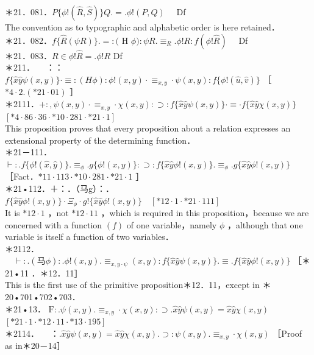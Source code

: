 \documentclass[10pt]{article}
\begin{document}
＊21．081．$P\{\phi!(\widehat{R}, \widehat{S})\} Q .=. \phi!(P, Q) \quad$ Df\\
The convention as to typographic and alphabetic order is here retained．\\
＊21．082．$f\{\hat{R}(\psi R)\} .=:($ H $\phi): \psi R . \equiv_{R} . \phi!R: f(\phi!\hat{R}) \quad$ Df\\
＊21．083．$R \in \phi!\hat{R}=. \phi!R$ Df\\
＊211．$\quad$ ：：$f\{\hat{x} \hat{y} \psi(x, y)\} \cdot \equiv:(H \phi): \phi!(x, y) \cdot \equiv_{x, y} \cdot \psi(x, y): f\{\phi!(\hat{u}, \hat{v})\}$ ［ $* 4 \cdot 2 .(* 21 \cdot 01)$ ］\\
＊2111．$+:, \psi(x, y) \cdot \equiv_{x, y} \cdot \chi(x, y): \supset: f\{\hat{x} \hat{y} \psi(x, y)\} \cdot \equiv \cdot f\{\hat{x} \hat{y} \chi(x, y)\}$\\
$[* 4 \cdot 86 \cdot 36 \cdot * 10 \cdot 281 \cdot * 21 \cdot 1]$\\
This proposition proves that every proposition about a relation expresses an extensional property of the determining function．\\
＊21－111．$\vdash: . f\{\phi!(\hat{x}, \hat{y})\} . \equiv_{\phi} . g\{\phi!(x, y)\}: \supset: f\{\hat{x} \hat{y} \phi!(x, y)\} . \equiv_{\phi} . g\{\hat{x} \hat{y} \phi!(x, y)\}$ ［Fact．$* 11 \cdot 113 \cdot * 10 \cdot 281 \cdot * 21 \cdot 1$ ］\\
＊21•112．＋：．（马g）：．$f\{\hat{x} \hat{y} \phi!(x, y)\} \cdot \Xi_{\phi} \cdot g!\{\hat{x} \hat{y} \phi!(x, y)\} \quad[* 12 \cdot 1 \cdot * 21 \cdot 111]$\\
It is $* 12 \cdot 1$ ，not $* 12 \cdot 11$ ，which is required in this proposition，because we are concerned with a function $(f)$ of one variable，namely $\phi$ ，although that one variable is itself a function of two variables．\\
＊2112．$\quad \vdash: .(马 \phi): . \phi!(x, y) . \equiv_{x, y \cdot \psi}(x, y): f\{\hat{x} \hat{y} \psi(x, y)\} . \equiv . f\{\hat{x} \hat{y} \phi!(x, y)\}$ ［＊21•11 ．＊12．11］\\
This is the first use of the primitive proposition＊12．11，except in ＊20•701•702•703．\\
＊21•13． $\mathrm{F}: . \psi(x, y) . \equiv_{x, y} \cdot \chi(x, y): \supset . \hat{x} \hat{y} \psi(x, y)=\hat{x} \hat{y} \chi(x, y)$\\
$[* 21 \cdot 1 \cdot * 12 \cdot 11 \cdot * 13 \cdot 195]$\\
＊2114．$\quad$ ：$. \hat{x} \hat{y} \psi(x, y)=\hat{x} \hat{y} \chi(x, y) . \supset: \psi(x, y) . \equiv_{x, y} \cdot \chi(x, y)$ ［Proof as in＊20－14］\\
\end{document}
